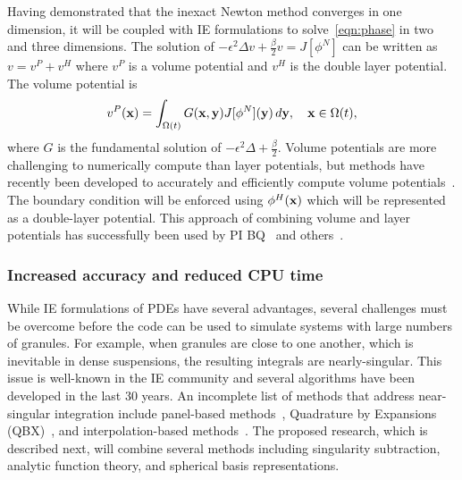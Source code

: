 Having demonstrated that the inexact Newton method converges in one
dimension, it will be coupled with IE formulations to
solve~\eqref{eqn:phase} in two and three dimensions. The solution of
$-\epsilon^2 \Delta v + \tfrac{\beta}{2} v = J[\phi^N]$ can be written
as $v = v^P + v^H$ where $v^P$ is a volume potential and
$v^H$ is the double layer potential. The volume potential is
\begin{align*}
  v^{P}(\mathbf{x}) = \int_{\Omega(t)} G(\mathbf{x},\mathbf{y}) J[\phi^N](\mathbf{y})\, d\mathbf{y}, 
    \quad \mathbf{x} \in \Omega(t),
\end{align*}
where $G$ is the fundamental solution of $-\epsilon^2 \Delta +
\tfrac{\beta}{2}$. Volume potentials are more challenging to numerically
compute than layer potentials, but methods have recently been developed
to accurately and efficiently compute volume
potentials~\cite{fry-leh-tor2018, and-zhu-vee2022}. The boundary
condition will be enforced using $\phi^H(\mathbf{x})$ which will be represented
as a double-layer potential. This approach of combining volume and layer
potentials has successfully been used by PI BQ~\cite{kro-qua2010} and
others~\cite{fry-kro-tor2019, kli-ask-kro2020, che-hua-lei2005}.

\subsubsection{Increased accuracy and reduced CPU time}
\label{subsec:NumericalIssues}
While IE formulations of PDEs have several advantages, several
challenges must be overcome before the code can be used to simulate
systems with large numbers of granules. For example, when granules are
close to one another, which is inevitable in dense suspensions, the
resulting integrals are nearly-singular. This issue is well-known in the
IE community and several algorithms have been developed in the last 30
years. An incomplete list of methods that address near-singular
integration include panel-based methods~\cite{helsing_2008a,
helsing_tutorial_2012}, Quadrature by Expansions
(QBX)~\cite{din-hua-mar-tan2021, klo-bar-gre-one2013, ste-bar2022,
af2018sisc}, and interpolation-based methods~\cite{ying_2006,
qua-bir2014, rah-vee-zor-bir2015}. The proposed research, which is
described next,  will combine several methods including singularity
subtraction, analytic function theory, and spherical basis
representations.

